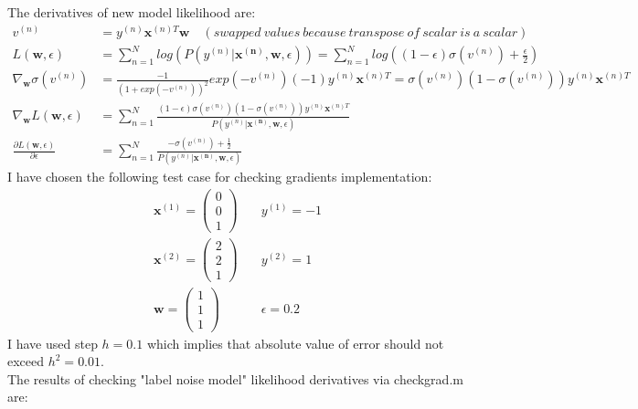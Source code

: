 \documentclass{article}
\newcommand{\vect}[1]{\boldsymbol{#1}} %
\begin{document}
\begin{enumerate}[label=(\alph*)]
						The derivatives of new model likelihood are:
						\begin{align}
							v^{(n)} &= y^{(n)}\vect{x}^{(n)T}\vect{w} \quad (swapped\ values\ because\ transpose\ of\ scalar\ is\ a\ scalar)
							\\
							L(\vect{w}, \epsilon) &= \sum_{n=1}^{N}log(P(y^{(n)}|\vect{x^{(n)}}, \vect{w}, \epsilon)) = 
							\sum_{n=1}^{N}log((1-\epsilon)\sigma(v^{(n)}) + \frac{\epsilon}{2}) 
							\\
							\nabla_{\vect{w}}\sigma(v^{(n)}) &= 
							\frac{-1} {(1 + exp(-v^{(n)}))^2} exp(-v^{(n)}) (-1) y^{(n)} \vect{x}^{(n)T} 
							= \sigma(v^{(n)}) (1 - \sigma(v^{(n)})) y^{(n)}\vect{x}^{(n)T}
							\\
							\nabla_{\vect{w}}L(\vect{w}, \epsilon) &= 
							\sum_{n=1}^{N}
								\frac
									{ (1 - \epsilon) \sigma(v^{(n)}) (1 - \sigma(v^{(n)}))  y^{(n)} \vect{x}^{(n)T} } 
									{ P(y^{(n)}|\vect{x^{(n)}}, \vect{w}, \epsilon) }				
							\\
							\frac{\partial L(\vect{w}, \epsilon)}{\partial \epsilon} &=
							 \sum_{n=1}^{N} 
								 \frac 
									 {-\sigma(v^{(n)}) + \frac{1}{2}} 
									 {P(y^{(n)}|\vect{x^{(n)}}, \vect{w}, \epsilon)}		
						\end{align}
						I have chosen the following test case for checking gradients implementation:
						\begin{align*}
							\vect{x}^{(1)} = \left(\begin{matrix} 0\\ 0\\ 1 \end{matrix}\right)
							&\quad
							y^{(1)} = -1
							\\
							\vect{x}^{(2)} = \left(\begin{matrix} 2\\ 2\\ 1 \end{matrix}\right)
							&\quad
							y^{(2)}=1 
							\\
							\vect{w} = \left(\begin{matrix} 1\\ 1\\ 1 \end{matrix}\right)
							&\quad
							\epsilon = 0.2
						\end{align*}
						I have used step $h =0.1$ which implies that absolute value of error should not exceed $h^2=0.01$.\\ 
						The results of checking "label noise model" likelihood derivatives via checkgrad.m are:

\end{enumerate}
\end{document}
